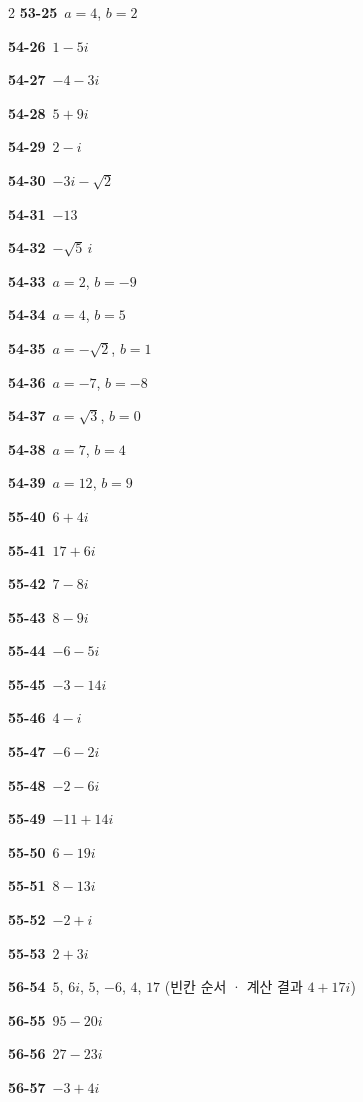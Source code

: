 \documentclass[10pt,a4paper]{article}
\begin{document}
\begin{multicols}{2}
\noindent\textbf{53-25}\ $a=4$, $b=2$\par
\noindent\textbf{54-26}\ $1-5i$\par
\noindent\textbf{54-27}\ $-4-3i$\par
\noindent\textbf{54-28}\ $5+9i$\par
\noindent\textbf{54-29}\ $2-i$\par
\noindent\textbf{54-30}\ $-3i-\sqrt{2}$\par
\noindent\textbf{54-31}\ $-13$\par
\noindent\textbf{54-32}\ $-\sqrt{5}\,i$\par
\noindent\textbf{54-33}\ $a=2$, $b=-9$\par
\noindent\textbf{54-34}\ $a=4$, $b=5$\par
\noindent\textbf{54-35}\ $a=-\sqrt{2}$, $b=1$\par
\noindent\textbf{54-36}\ $a=-7$, $b=-8$\par
\noindent\textbf{54-37}\ $a=\sqrt{3}$, $b=0$\par
\noindent\textbf{54-38}\ $a=7$, $b=4$\par
\noindent\textbf{54-39}\ $a=12$, $b=9$\par
\noindent\textbf{55-40}\ $6+4i$\par
\noindent\textbf{55-41}\ $17+6i$\par
\noindent\textbf{55-42}\ $7-8i$\par
\noindent\textbf{55-43}\ $8-9i$\par
\noindent\textbf{55-44}\ $-6-5i$\par
\noindent\textbf{55-45}\ $-3-14i$\par
\noindent\textbf{55-46}\ $4-i$\par
\noindent\textbf{55-47}\ $-6-2i$\par
\noindent\textbf{55-48}\ $-2-6i$\par
\noindent\textbf{55-49}\ $-11+14i$\par
\noindent\textbf{55-50}\ $6-19i$\par
\noindent\textbf{55-51}\ $8-13i$\par
\noindent\textbf{55-52}\ $-2+i$\par
\noindent\textbf{55-53}\ $2+3i$\par
\noindent\textbf{56-54}\ $5$, $6i$, $5$, $-6$, $4$, $17$ (빈칸 순서 · 계산 결과 $4+17i$)\par
\noindent\textbf{56-55}\ $95-20i$\par
\noindent\textbf{56-56}\ $27-23i$\par
\noindent\textbf{56-57}\ $-3+4i$\par

\end{multicols}
\end{document}
